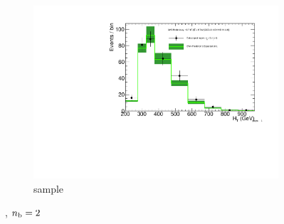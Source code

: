 \begin{figure}[h!]
\begin{subfigure}[b]{0.48\textwidth}
    \includegraphics[width=\textwidth,page=4]
    {Figs/results/v0/greenBand/bestFit_2012dev_RQcdZero_fZinvAll_2b_ge4j-1_smOnly}
    \caption{\mj sample}
  \end{subfigure}
  \caption{\njhigh, $n_{\text{b}} = 2$}
  \label{fig:green_fits_2b_ge4j}
\end{figure}


